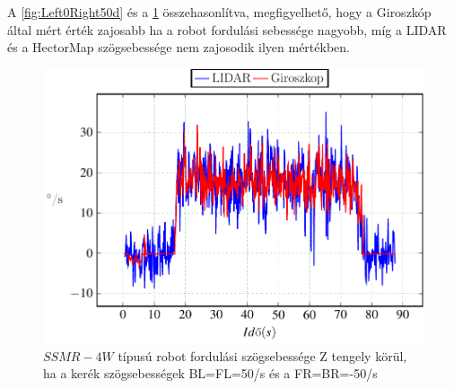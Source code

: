 A \ref{fig:Left0Right50d} és a \ref{fig:Left_n50Right50d} összehasonlítva, megfigyelhető, hogy a Giroszkóp által mért érték zajosabb ha a robot fordulási sebessége nagyobb, míg a LIDAR és a HectorMap szögsebessége nem zajosodik ilyen mértékben.

\begin{figure}[H]
  \includegraphics{tikz/Left_n50Right50d.pdf}
  \caption{$SSMR-4W$ típusú robot fordulási szögsebessége Z tengely körül, ha a kerék szögsebességek BL=FL=50\degree/s és a FR=BR=-50\degree/s}
    \label{fig:Left_n50Right50d}
\end{figure}










